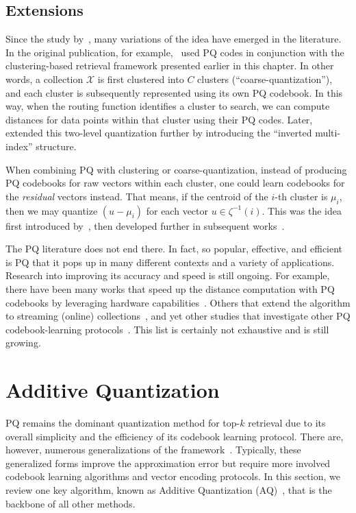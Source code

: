 \subsection{Extensions}

Since the study by~\cite{pq}, many variations of the idea have emerged in
the literature. In the original publication, for example,~\cite{pq}
used PQ codes in conjunction with the clustering-based retrieval framework presented earlier
in this chapter. In other words, a collection $\mathcal{X}$ is first clustered
into $C$ clusters (``coarse-quantization''), and each cluster
is subsequently represented using its own PQ codebook.
In this way, when the routing function identifies a cluster to search,
we can compute distances for data points within that cluster using their PQ codes.
Later,~\cite{invertedMultiIndex} extended this two-level quantization further
by introducing the ``inverted multi-index'' structure.

When combining PQ with clustering or coarse-quantization, instead of producing
PQ codebooks for raw vectors within each cluster, one could learn codebooks
for the \emph{residual} vectors instead. That means, if the centroid of the
$i$-th cluster is $\mu_i$, then we may quantize $(u - \mu_i)$ for each
vector $u \in \zeta^{-1}(i)$. This was the idea first introduced by~\cite{pq},
then developed further in subsequent works~\citep{locallyOptimizedPQ,multiscaleQuantization}.

The PQ literature does not end there. In fact, so popular, effective, and efficient is PQ
that it pops up in many different contexts and a variety of applications. Research into improving
its accuracy and speed is still ongoing. For example, there have been many works that speed
up the distance computation with PQ codebooks by leveraging hardware capabilities~\citep{pqWithGPU,Andre_2021,pqCacheLocality}.
Others that extend the algorithm to streaming (online) collections~\citep{onlinePQ},
and yet other studies that investigate other PQ
codebook-learning protocols~\citep{deepPQ,Yu_2018_ECCV,chen2020DifferentiablePQ,Jang_2021_ICCV,Klein_2019_CVPR,lu2023differeitableOPQ}.
This list is certainly not exhaustive and is still growing.

\section{Additive Quantization}

PQ remains the dominant quantization method for top-$k$ retrieval due to its overall simplicity
and the efficiency of its codebook learning protocol. There are, however, numerous generalizations of the
framework~\citep{additiveQuantization,chen2010approximate,Niu2023RVPQ,liu2015improvedRVQ,Ozan2016CompetitiveQuantization,krishnan2021projective}.
Typically, these generalized forms improve the approximation error but require more involved
codebook learning algorithms and vector encoding protocols. In this section, we review
one key algorithm, known as Additive Quantization (AQ)~\citep{additiveQuantization},
that is the backbone of all other methods.

